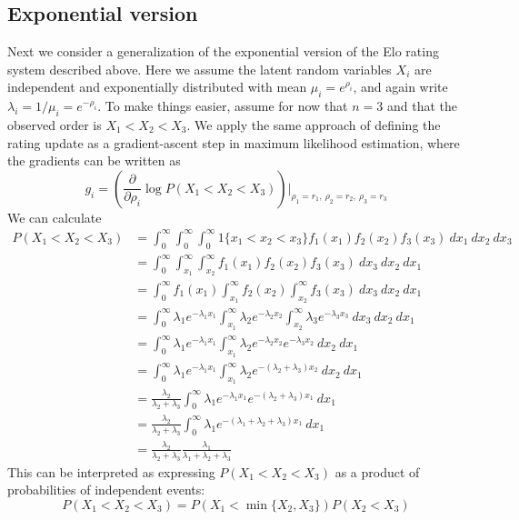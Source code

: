 \documentclass{article}
\begin{document}
	\subsection{Exponential version}
	Next we consider a generalization of the exponential version of the Elo rating system described above. Here we assume
	the latent random variables $X_i$ are independent and exponentially distributed with mean $\mu_i = e^{\rho_i}$, and
	again write $\lambda_i = 1 / \mu_i = e^{-\rho_i}$. To make
	things easier, assume for now that $n=3$ and that the observed order is $X_1 < X_2 < X_3$. We apply the same approach of
	defining the rating update as a gradient-ascent step in maximum likelihood estimation, where the gradients can be written as
	$$g_i = \left(\frac{\partial}{\partial \rho_i} \log P(X_1 < X_2 < X_3)\right) \bigg|_{\rho_1=r_1,\ \rho_2=r_2,\ \rho_3=r_3}$$
	We can calculate
	\begin{align*}
		P(X_1 < X_2 < X_3) &= \int_0^{\infty} \int_0^{\infty} \int_0^{\infty} 1\{x_1 < x_2 < x_3\} f_1(x_1) f_2(x_2) f_3(x_3)\ dx_1\ dx_2\ dx_3 \\
		&= \int_0^{\infty} \int_{x_1}^{\infty} \int_{x_2}^{\infty} f_1(x_1) f_2(x_2) f_3(x_3)\ dx_3\ dx_2\ dx_1 \\
		&= \int_0^{\infty} f_1(x_1) \int_{x_1}^{\infty} f_2(x_2) \int_{x_2}^{\infty} f_3(x_3)\ dx_3\ dx_2\ dx_1 \\
		&= \int_0^{\infty} \lambda_1 e^{-\lambda_1 x_1} \int_{x_1}^{\infty} \lambda_2 e^{-\lambda_2 x_2} \int_{x_2}^{\infty} \lambda_3 e^{-\lambda_3 x_3}\ dx_3\ dx_2\ dx_1 \\
		&= \int_0^{\infty} \lambda_1 e^{-\lambda_1 x_1} \int_{x_1}^{\infty} \lambda_2 e^{-\lambda_2 x_2} e^{-\lambda_3 x_2}\ dx_2\ dx_1 \\
		&= \int_0^{\infty} \lambda_1 e^{-\lambda_1 x_1} \int_{x_1}^{\infty} \lambda_2 e^{-(\lambda_2 + \lambda_3)x_2} \ dx_2\ dx_1 \\
		&= \frac{\lambda_2}{\lambda_2 + \lambda_3} \int_0^{\infty} \lambda_1 e^{-\lambda_1 x_1} e^{-(\lambda_2 + \lambda_3)x_1} \ dx_1 \\
		&= \frac{\lambda_2}{\lambda_2 + \lambda_3} \int_0^{\infty} \lambda_1 e^{-(\lambda_1 + \lambda_2 + \lambda_3)x_1} \ dx_1 \\
		&= \frac{\lambda_2}{\lambda_2 + \lambda_3} \frac{\lambda_1}{\lambda_1 + \lambda_2 + \lambda_3}
	\end{align*}
	This can be interpreted as expressing $P(X_1 < X_2 < X_3)$ as a product of probabilities of independent events:
	$$P(X_1 < X_2 < X_3) = P(X_1 < \min\{X_2, X_3\})P(X_2 < X_3)$$
\end{document}
